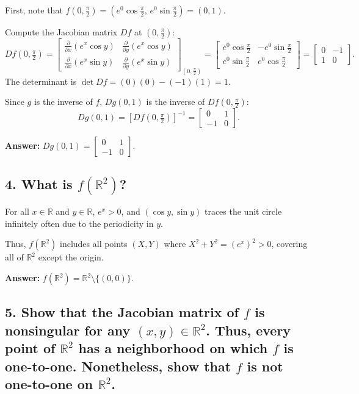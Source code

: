 \documentclass[lang=en,11pt]{template}
\begin{document}
First, note that \( f(0, \tfrac{\pi}{2}) = \left( e^0 \cos \tfrac{\pi}{2}, \, e^0 \sin \tfrac{\pi}{2} \right) = (0, 1) \).

Compute the Jacobian matrix \( Df \) at \( (0, \tfrac{\pi}{2}) \):
\[
Df(0, \tfrac{\pi}{2}) = \begin{bmatrix}
\frac{\partial}{\partial x} (e^x \cos y) & \frac{\partial}{\partial y} (e^x \cos y) \\
\frac{\partial}{\partial x} (e^x \sin y) & \frac{\partial}{\partial y} (e^x \sin y)
\end{bmatrix}_{(0, \frac{\pi}{2})} = \begin{bmatrix}
e^0 \cos \tfrac{\pi}{2} & -e^0 \sin \tfrac{\pi}{2} \\
e^0 \sin \tfrac{\pi}{2} & e^0 \cos \tfrac{\pi}{2}
\end{bmatrix} = \begin{bmatrix}
0 & -1 \\
1 & 0
\end{bmatrix}.
\]
The determinant is \( \det Df = (0)(0) - (-1)(1) = 1 \).

Since \( g \) is the inverse of \( f \), \( Dg(0, 1) \) is the inverse of \( Df(0, \tfrac{\pi}{2}) \):
\[
Dg(0, 1) = [Df(0, \tfrac{\pi}{2})]^{-1} = \begin{bmatrix}
0 & 1 \\
-1 & 0
\end{bmatrix}.
\]

\textbf{Answer:} \( Dg(0, 1) = \begin{bmatrix} 0 & 1 \\ -1 & 0 \end{bmatrix} \).

\subsection*{4. What is \( f(\mathbb{R}^2) \)?}

For all \( x \in \mathbb{R} \) and \( y \in \mathbb{R} \), \( e^x > 0 \), and \( (\cos y, \sin y) \) traces the unit circle infinitely often due to the periodicity in \( y \).

Thus, \( f(\mathbb{R}^2) \) includes all points \( (X, Y) \) where \( X^2 + Y^2 = (e^x)^2 > 0 \), covering all of \( \mathbb{R}^2 \) except the origin.

\textbf{Answer:} \( f(\mathbb{R}^2) = \mathbb{R}^2 \setminus \{ (0, 0) \} \).

\subsection*{5. Show that the Jacobian matrix of \( f \) is nonsingular for any \( (x, y) \in \mathbb{R}^2 \). Thus, every point of \( \mathbb{R}^2 \) has a neighborhood on which \( f \) is one-to-one. Nonetheless, show that \( f \) is not one-to-one on \( \mathbb{R}^2 \).}
\end{document}
